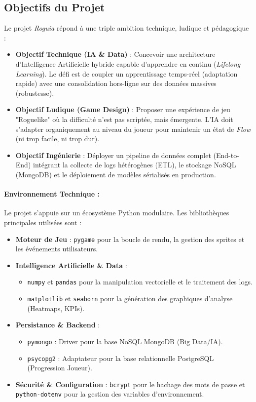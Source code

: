 \documentclass[12pt,a4paper]{article}
\begin{document}
\subsection{Objectifs du Projet}
Le projet \textit{Roguia} répond à une triple ambition technique, ludique et pédagogique :

\begin{itemize}
    \item \textbf{Objectif Technique (IA \& Data)} : Concevoir une architecture d'Intelligence Artificielle hybride capable d'apprendre en continu (\textit{Lifelong Learning}). Le défi est de coupler un apprentissage temps-réel (adaptation rapide) avec une consolidation hors-ligne sur des données massives (robustesse).
    
    \item \textbf{Objectif Ludique (Game Design)} : Proposer une expérience de jeu "Roguelike" où la difficulté n'est pas scriptée, mais émergente. L'IA doit s'adapter organiquement au niveau du joueur pour maintenir un état de \textit{Flow} (ni trop facile, ni trop dur).
    
    \item \textbf{Objectif Ingénierie} : Déployer un pipeline de données complet (End-to-End) intégrant la collecte de logs hétérogènes (ETL), le stockage NoSQL (MongoDB) et le déploiement de modèles sérialisés en production.
\end{itemize}

\paragraph{Environnement Technique :}
Le projet s'appuie sur un écosystème Python modulaire. Les bibliothèques principales utilisées sont :

\begin{itemize}
    \item \textbf{Moteur de Jeu} : \texttt{pygame} pour la boucle de rendu, la gestion des sprites et les événements utilisateurs.
    \item \textbf{Intelligence Artificielle \& Data} : 
    \begin{itemize}
        \item \texttt{numpy} et \texttt{pandas} pour la manipulation vectorielle et le traitement des logs.
        \item \texttt{matplotlib} et \texttt{seaborn} pour la génération des graphiques d'analyse (Heatmaps, KPIs).
    \end{itemize}
    \item \textbf{Persistance \& Backend} : 
    \begin{itemize}
        \item \texttt{pymongo} : Driver pour la base NoSQL MongoDB (Big Data/IA).
        \item \texttt{psycopg2} : Adaptateur pour la base relationnelle PostgreSQL (Progression Joueur).
    \end{itemize}
    \item \textbf{Sécurité \& Configuration} : \texttt{bcrypt} pour le hachage des mots de passe et \texttt{python-dotenv} pour la gestion des variables d'environnement.
\end{itemize}
\end{document}
